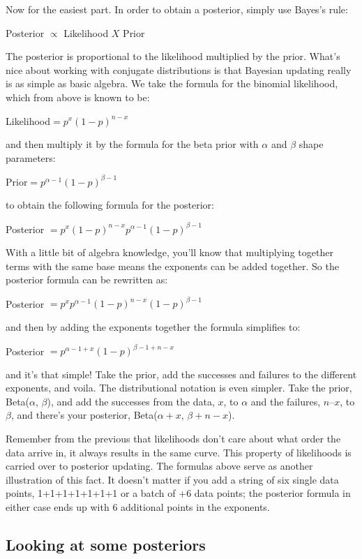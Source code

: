 Now for the easiest part. In order to obtain a posterior, simply use Bayes's rule:

Posterior $\propto$ Likelihood $X$ Prior

The posterior is proportional to the likelihood multiplied by the prior. What's nice about working with conjugate distributions is that Bayesian updating really is as simple as basic algebra. We take the formula for the binomial likelihood, which from above is known to be:

Likelihood$=p^{x}(1-p)^{n-x}$

and then multiply it by the formula for the beta prior with $\alpha$ and $\beta$ shape parameters:

Prior$=p^{\alpha-1}(1-p)^{\beta-1}$ 

to obtain the following formula for the posterior:

Posterior $=p^{x}(1-p)^{n-x} p^{\alpha-1}(1-p)^{\beta-1}$

With a little bit of algebra knowledge, you'll know that multiplying together terms with the same base means the exponents can be added together. So the posterior formula can be rewritten as:

Posterior $=p^{x} p^{\alpha-1}(1-p)^{n-x}(1-p)^{\beta-1}$

and then by adding the exponents together the formula simplifies to:

Posterior $=p^{\alpha-1+x}(1-p)^{\beta-1+n-x}$

and it's that simple! Take the prior, add the successes and failures to the different exponents, and voila. The distributional notation is even simpler. Take the prior, Beta($\alpha$, $\beta$), and add the successes from the data, $x$, to $\alpha$ and the failures, $n – x$, to $\beta$, and there's your posterior, Beta($\alpha+x$, $\beta+n-x$).

Remember from the previous that likelihoods don't care about what order the data arrive in, it always results in the same curve. This property of likelihoods is carried over to posterior updating. The formulas above serve as another illustration of this fact. It doesn't matter if you add a string of six single data points, 1+1+1+1+1+1+1 or a batch of +6 data points; the posterior formula in either case ends up with 6 additional points in the exponents.

\subsection{Looking at some posteriors}

